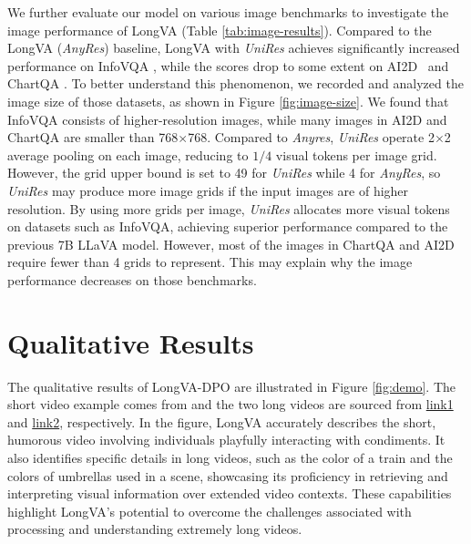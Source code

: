 We further evaluate our model on various image benchmarks to investigate the image performance of LongVA (Table \ref{tab:image-results}). Compared to the LongVA (\textit{AnyRes}) baseline, LongVA with \textit{UniRes} achieves significantly increased performance on InfoVQA \citep{mathew2020docvqa}, while the scores drop to some extent on AI2D~\citep{kembhavi2016diagram} and ChartQA \citep{masry2022chartqa}. To better understand this phenomenon, we recorded and analyzed the image size of those datasets, as shown in Figure \ref{fig:image-size}. We found that InfoVQA consists of higher-resolution images, while many images in AI2D and ChartQA are smaller than 768$\times$768.
Compared to \textit{Anyres}, \textit{UniRes} operate 2$\times$2 average pooling on each image, reducing to $1/4$ visual tokens per image grid. However, the grid upper bound is set to 49 for \textit{UniRes} while 4 for \textit{AnyRes}, so \textit{UniRes} may produce more image grids if the input images are of higher resolution. By using more grids per image, \textit{UniRes} allocates more visual tokens on datasets such as InfoVQA, achieving superior performance compared to the previous 7B LLaVA model. However, most of the images in ChartQA and AI2D require fewer than 4 grids to represent. This may explain why the image performance decreases on those benchmarks.

\section{Qualitative Results}
The qualitative results of LongVA-DPO are illustrated in Figure \ref{fig:demo}. The short video example comes from \citep{xie2023funqa} and the two long videos are sourced from \href{https://www.bilibili.com/video/BV1Kn4y1d7G7/?buvid=c066506d947f48e761c78e00991fd406&from_spmid=main.space-contribution.0.0&is_story_h5=false&mid=804D54DYmsNyGN1vdgHxnA%3D%3D&p=1&plat_id=116&share_from=ugc&share_medium=iphone&share_plat=ios&share_session_id=35F6AE42-FAD2-436C-B164-107EF91E283D&share_source=WEIXIN&share_tag=s_i&spmid=united.player-video-detail.0.0&timestamp=1719191857&unique_k=AOiQBaI&up_id=23947287&share_source=weixin}{link1} and \href{https://www.bilibili.com/video/BV1F4411v7rj/?spm_id_from=333.1007.top_right_bar_window_custom_collection.content.click&vd_source=a8b9ec3a8fda7923ed9b151c46917050}{link2}, respectively. In the figure, LongVA accurately describes the short, humorous video involving individuals playfully interacting with condiments. It also identifies specific details in long videos, such as the color of a train and the colors of umbrellas used in a scene, showcasing its proficiency in retrieving and interpreting visual information over extended video contexts. These capabilities highlight LongVA's potential to overcome the challenges associated with processing and understanding extremely long videos.

